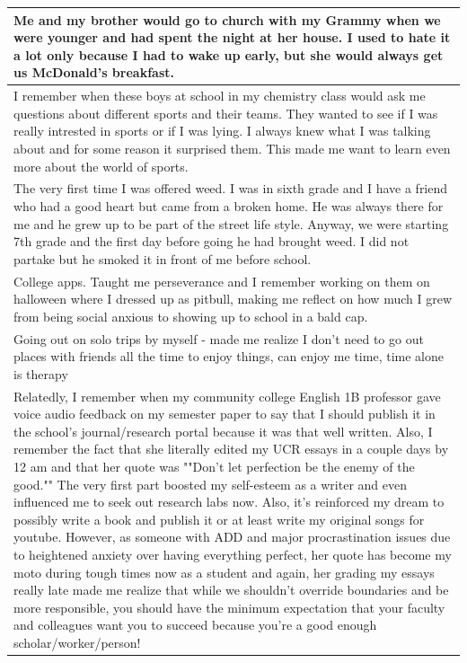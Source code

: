 \documentclass[
  .7em,
  letterpaper,
  DIV=11,
  numbers=noendperiod]{scrartcl}
\begin{document}
\begin{table}
\begin{tabular}{l}
\hline
Me and my brother would go to church with my Grammy when we were younger and had spent the night at her house. I used to hate it a lot only because I had to wake up early, but she would always get us McDonald's breakfast.\\
\hline
I remember when these boys at school in my chemistry class would ask me questions about different sports and their teams. They wanted to see if I was really intrested in sports or if I was lying. I always knew what I was talking about and for some reason it surprised them. This made me want to learn even more about the world of sports.\\
\hline
The very first time I was offered weed. I was in sixth grade and I have a friend who had a good heart but came from a broken home. He was always there for me and he grew up to be part of the street life style. Anyway, we were starting 7th grade and the first day before going he had brought weed. I did not partake but he smoked it in front of me before school.\\
\hline
College apps. Taught me perseverance and I remember working on them on halloween where I dressed up as pitbull, making me reflect on how much I grew from being social anxious to showing up to school in a bald cap.\\
\hline
Going out on solo trips by myself - made me realize I don't need to go out places with friends all the time to enjoy things, can enjoy me time, time alone is therapy\\
\hline
Relatedly, I remember when my community college English 1B professor gave voice audio feedback on my semester paper to say that I should publish it in the school's journal/research portal because it was that well written. Also, I remember the fact that she literally edited my UCR essays in a couple days by 12 am and that her quote was ""Don't let perfection be the enemy of the good."" The very first part boosted my self-esteem as a writer and even influenced me to seek out research labs now. Also, it's reinforced my dream to possibly write a book and publish it or at least write my original songs for youtube. However, as someone with ADD and major procrastination issues due to heightened anxiety over having everything perfect, her quote has become my moto during tough times now as a student and again, her grading my essays really late made me realize that while we shouldn't override boundaries and be more responsible, you should have the minimum expectation that your faculty and colleagues want you to succeed because you're a good enough scholar/worker/person!\\

\end{tabular}
\end{table}
\end{document}
